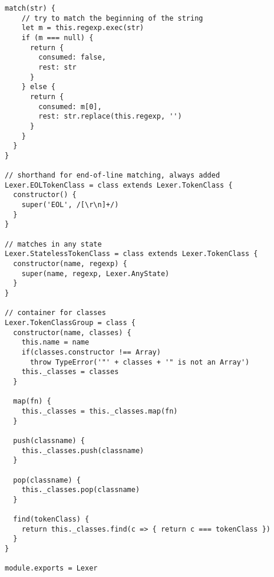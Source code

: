 \begin{lstlisting}[frame=single]
  match(str) {
    // try to match the beginning of the string
    let m = this.regexp.exec(str)
    if (m === null) {
      return {
        consumed: false,
        rest: str
      }
    } else {
      return {
        consumed: m[0],
        rest: str.replace(this.regexp, '')
      }
    }
  }
}

// shorthand for end-of-line matching, always added
Lexer.EOLTokenClass = class extends Lexer.TokenClass {
  constructor() {
    super('EOL', /[\r\n]+/)
  }
}

// matches in any state
Lexer.StatelessTokenClass = class extends Lexer.TokenClass {
  constructor(name, regexp) {
    super(name, regexp, Lexer.AnyState)
  }
}

// container for classes
Lexer.TokenClassGroup = class {
  constructor(name, classes) {
    this.name = name
    if(classes.constructor !== Array)
      throw TypeError('"' + classes + '" is not an Array')
    this._classes = classes
  }
  
  map(fn) {
    this._classes = this._classes.map(fn)
  }
  
  push(classname) {
    this._classes.push(classname)
  }
  
  pop(classname) {
    this._classes.pop(classname)
  }
  
  find(tokenClass) {
    return this._classes.find(c => { return c === tokenClass })
  }
}

module.exports = Lexer
\end{lstlisting}